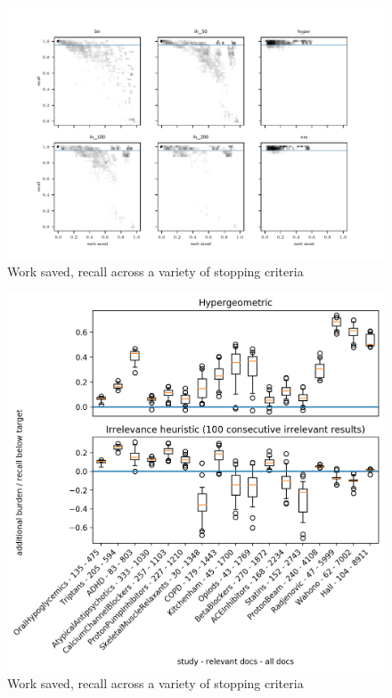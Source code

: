 \documentclass{bmcart}
\begin{document}
	\begin{figure}
	\includegraphics[width=\linewidth]{../images/results_hex}
	\caption{Work saved, recall across a variety of stopping criteria}
	\label{results-hex}
\end{figure}

	\begin{figure}
	\includegraphics[width=\linewidth]{../images/ab_recall_studies}
	\caption{Work saved, recall across a variety of stopping criteria}
	\label{ab_recall_studies}
\end{figure}
\end{document}
